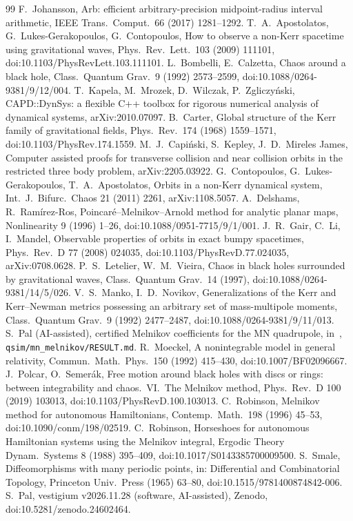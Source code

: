\documentclass[11pt]{amsart}
\theoremstyle{remark}\newtheorem*{remark}{Remark}
\begin{document}
\begin{thebibliography}{99}
 F.~Johansson, Arb: efficient arbitrary-precision midpoint-radius interval arithmetic, IEEE Trans.\ Comput.\ 66 (2017) 1281--1292.
 T.~A.~Apostolatos, G.~Lukes-Gerakopoulos, G.~Contopoulos, How to observe a non-Kerr spacetime using gravitational waves, Phys.\ Rev.\ Lett.\ 103 (2009) 111101, doi:10.1103/PhysRevLett.103.111101.
 L.~Bombelli, E.~Calzetta, Chaos around a black hole, Class.\ Quantum Grav.\ 9 (1992) 2573--2599, doi:10.1088/0264-9381/9/12/004.
 T.~Kapela, M.~Mrozek, D.~Wilczak, P.~Zgliczy\'nski, CAPD::DynSys: a flexible C++ toolbox for rigorous numerical analysis of dynamical systems, arXiv:2010.07097.
 B.~Carter, Global structure of the Kerr family of gravitational fields, Phys.\ Rev.\ 174 (1968) 1559--1571, doi:10.1103/PhysRev.174.1559.
 M.~J.~Capi\'nski, S.~Kepley, J.~D.~Mireles James, Computer assisted proofs for transverse collision and near collision orbits in the restricted three body problem, arXiv:2205.03922.
 G.~Contopoulos, G.~Lukes-Gerakopoulos, T.~A.~Apostolatos, Orbits in a non-Kerr dynamical system, Int.\ J.\ Bifurc.\ Chaos 21 (2011) 2261, arXiv:1108.5057.
 A.~Delshams, R.~Ram\'irez-Ros, Poincar\'e--Melnikov--Arnold method for analytic planar maps, Nonlinearity 9 (1996) 1--26, doi:10.1088/0951-7715/9/1/001.
 J.~R.~Gair, C.~Li, I.~Mandel, Observable properties of orbits in exact bumpy spacetimes, Phys.\ Rev.\ D 77 (2008) 024035, doi:10.1103/PhysRevD.77.024035, arXiv:0708.0628.
 P.~S.~Letelier, W.~M.~Vieira, Chaos in black holes surrounded by gravitational waves, Class.\ Quantum Grav.\ 14 (1997), doi:10.1088/0264-9381/14/5/026.
 V.~S.~Manko, I.~D.~Novikov, Generalizations of the Kerr and Kerr--Newman metrics possessing an arbitrary set of mass-multipole moments, Class.\ Quantum Grav.\ 9 (1992) 2477--2487, doi:10.1088/0264-9381/9/11/013.
 S.~Pal (AI-assisted), certified Melnikov coefficients for the MN quadrupole, in~\cite{Software}, \texttt{qsim/mn\_melnikov/RESULT.md}.
 R.~Moeckel, A nonintegrable model in general relativity, Commun.\ Math.\ Phys.\ 150 (1992) 415--430, doi:10.1007/BF02096667.
 J.~Polcar, O.~Semer\'ak, Free motion around black holes with discs or rings: between integrability and chaos.\ VI.\ The Melnikov method, Phys.\ Rev.\ D 100 (2019) 103013, doi:10.1103/PhysRevD.100.103013.
 C.~Robinson, Melnikov method for autonomous Hamiltonians, Contemp.\ Math.\ 198 (1996) 45--53, doi:10.1090/conm/198/02519.
 C.~Robinson, Horseshoes for autonomous Hamiltonian systems using the Melnikov integral, Ergodic Theory Dynam.\ Systems 8 (1988) 395--409, doi:10.1017/S0143385700009500.
 S.~Smale, Diffeomorphisms with many periodic points, in: Differential and Combinatorial Topology, Princeton Univ.\ Press (1965) 63--80, doi:10.1515/9781400874842-006.
 S.~Pal, vestigium v2026.11.28 (software, AI-assisted), Zenodo, doi:10.5281/zenodo.24602464.
\end{thebibliography}
\end{document}
